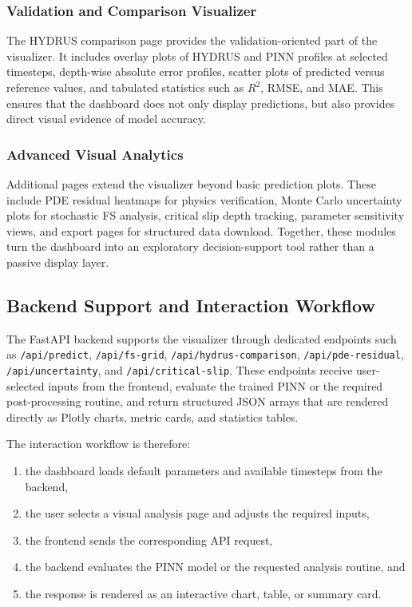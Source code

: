 \documentclass[12pt]{report}
\begin{document}
\subsubsection*{Validation and Comparison Visualizer}

The HYDRUS comparison page provides the validation-oriented part of the
visualizer. It includes overlay plots of HYDRUS and PINN profiles at
selected timesteps, depth-wise absolute error profiles, scatter plots
of predicted versus reference values, and tabulated statistics such as
$R^2$, RMSE, and MAE. This ensures that the dashboard does not only
display predictions, but also provides direct visual evidence of model
accuracy.

\subsubsection*{Advanced Visual Analytics}

Additional pages extend the visualizer beyond basic prediction plots.
These include PDE residual heatmaps for physics verification, Monte
Carlo uncertainty plots for stochastic FS analysis, critical slip depth
tracking, parameter sensitivity views, and export pages for structured
data download. Together, these modules turn the dashboard into an
exploratory decision-support tool rather than a passive display layer.

\subsection{Backend Support and Interaction Workflow}

The FastAPI backend supports the visualizer through dedicated endpoints
such as \texttt{/api/predict}, \texttt{/api/fs-grid},
\texttt{/api/hydrus-comparison}, \texttt{/api/pde-residual},
\texttt{/api/uncertainty}, and \texttt{/api/critical-slip}. These
endpoints receive user-selected inputs from the frontend, evaluate the
trained PINN or the required post-processing routine, and return
structured JSON arrays that are rendered directly as Plotly charts,
metric cards, and statistics tables.

The interaction workflow is therefore:

\begin{enumerate}
    \item the dashboard loads default parameters and available
    timesteps from the backend,
    \item the user selects a visual analysis page and adjusts the
    required inputs,
    \item the frontend sends the corresponding API request,
    \item the backend evaluates the PINN model or the requested
    analysis routine, and
    \item the response is rendered as an interactive chart, table, or
    summary card.
\end{enumerate}
\end{document}
